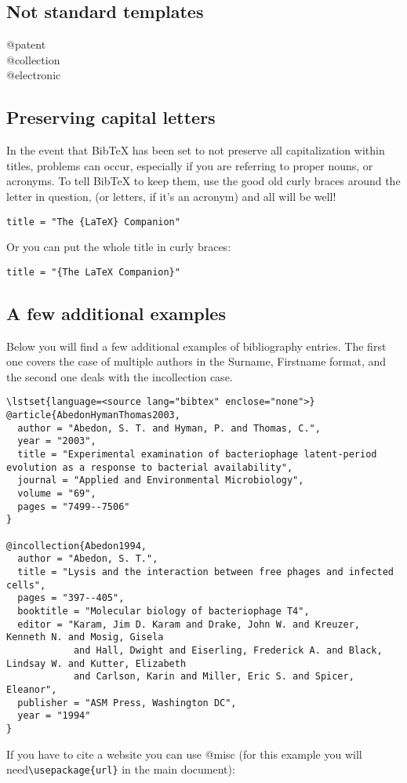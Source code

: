 \subsection{Not standard templates}
\begin{description}
\item[@patent]
\item[@collection]
\item[@electronic]
\end{description}

\subsection{Preserving capital letters}
In the event that BibTeX has been set to not preserve all capitalization within
titles, problems can occur, especially if you are referring to proper nouns, or
acronyms. To tell BibTeX to keep them, use the good old curly braces around the
letter in question, (or letters, if it's an acronym) and all will be well!

\begin{verbatim}title = "The {LaTeX} Companion"\end{verbatim}

Or you can put the whole title in curly braces:

\begin{verbatim}title = "{The LaTeX Companion}"\end{verbatim}

\subsection{A few additional examples}
Below you will find a few additional examples of bibliography entries. The
first one covers the case of multiple authors in the Surname, Firstname format,
and the second one deals with the incollection case.

\begin{lstlisting}
\lstset{language=<source lang="bibtex" enclose="none">}
@article{AbedonHymanThomas2003,
  author = "Abedon, S. T. and Hyman, P. and Thomas, C.",
  year = "2003",
  title = "Experimental examination of bacteriophage latent-period evolution as a response to bacterial availability",
  journal = "Applied and Environmental Microbiology",
  volume = "69",
  pages = "7499--7506"
}

@incollection{Abedon1994,
  author = "Abedon, S. T.",
  title = "Lysis and the interaction between free phages and infected cells",
  pages = "397--405",
  booktitle = "Molecular biology of bacteriophage T4",
  editor = "Karam, Jim D. Karam and Drake, John W. and Kreuzer, Kenneth N. and Mosig, Gisela
            and Hall, Dwight and Eiserling, Frederick A. and Black, Lindsay W. and Kutter, Elizabeth
            and Carlson, Karin and Miller, Eric S. and Spicer, Eleanor",
  publisher = "ASM Press, Washington DC",
  year = "1994"
}
\end{lstlisting}
If you have to cite a website you can use @misc (for this example you will
need\verb|\usepackage{url}| in the main document):

